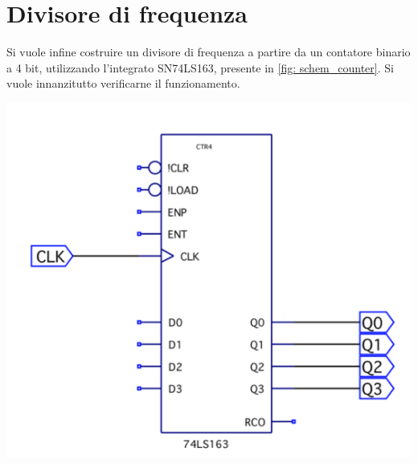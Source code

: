 \documentclass[10pt, a4paper, italian]{article}
\begin{document}
\section{Divisore di frequenza}
\begin{minipage}{0.6\textwidth}
Si vuole infine costruire un divisore di frequenza a partire da un contatore binario a 4 bit, utilizzando l'integrato SN74LS163, presente in \cref{fig: schem_counter}. Si vuole innanzitutto verificarne il funzionamento. 
\end{minipage}
\begin{minipage}{0.4\textwidth}
	\includegraphics[width=\textwidth]{schem_con}
\end{minipage}
\end{document}
